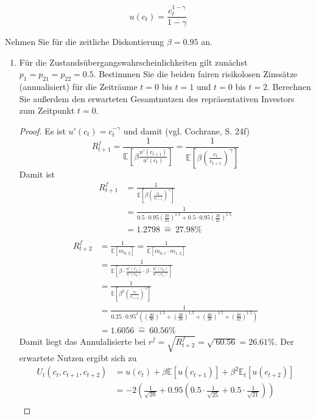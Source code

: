 \documentclass[12pt]{extreport} %
\theoremstyle{named}
\theoremstyle{nnamed}
\theoremstyle{itshape}
\theoremstyle{normal}
\begin{document}
$$ u(c_t) = \frac{c_t^{1-\gamma}}{1 - \gamma} $$

Nehmen Sie für die zeitliche Diskontierung $\beta = 0.95$ an.
\begin{enumerate}
	\item Für die Zustandsübergangswahrscheinlichkeiten gilt zunächst $p_1 = p_{21} = p_{22} = 0.5$. Bestimmen Sie die beiden fairen risikolosen Zinssätze (annualisiert) für die Zeiträume $t = 0$ bis $t = 1$ und $t = 0$ bis $t = 2$. Berechnen Sie außerdem den erwarteten Gesamtnutzen des repräsentativen Investors zum Zeitpunkt $t = 0$.
		\begin{proof}
		Es ist $u'(c_t) = c_t^{-\gamma}$ und damit (vgl. Cochrane, S. 24f)
		$$ R_{t+1}^f = \frac{1}{\mathbb{E}\left[ \beta \frac{u'(c_{t+1})}{u'(c_t)} \right]} = \frac{1}{\mathbb{E}\left[ \beta \left( \frac{c_{t}}{c_{t+1}} \right)^\gamma \right]} $$
		Damit ist
			\begin{align*}
				R_{t+1}^f & = \frac{1}{\mathbb{E}\left[ \beta \left( \frac{c_{t}}{c_{t+1}} \right)^\gamma \right]} \\
				& =\frac{1}{0.5 \cdot 0.95  \left( \frac{20}{25} \right)^{1.5} + 0.5 \cdot 0.95  \left( \frac{20}{21} \right)^{1.5} } \\
				& = 1.2798 ~ \hat{=} ~ 27.98\% \\
			\end{align*}
			\begin{align*}
				R_{t+2}^f & = \frac{1}{\mathbb{E}[m_{0,2}]} = \frac{1}{\mathbb{E}[m_{0,1} \cdot m_{1,2}]}  \\
				& = \frac{1}{\mathbb{E}\left[\beta \cdot \frac{u'(c_1)}{u'(c_0)} \cdot \beta \cdot \frac{u'(c_2)}{u'(c_1)} \right]} \\
				& = \frac{1}{\mathbb{E}\left[ \beta^2 \left( \frac{c_{t}}{c_{t+2}} \right)^\gamma \right]} \\
			& =\frac{1}{0.25 \cdot 0.95^2 \left( \left( \frac{20}{30} \right)^{1.5} +  \left( \frac{20}{26} \right)^{1.5} + \left( \frac{20}{26} \right)^{1.5} + \left( \frac{20}{22} \right)^{1.5} \right)} \\
			& = 1.6056~ \hat{=} ~60.56\%
			\end{align*}
			Damit liegt das Annulalisierte bei $r^f = \sqrt{R_{t+2}^f} = \sqrt{~60.56} = 26.61\%$. Der erwartete Nutzen ergibt sich zu
			\begin{align*}
				U_t(c_t, c_{t+1}, c_{t+2}) & = u(c_t) + \beta \mathbb{E}[ u(c_{t+1})] + \beta^2 \mathbb{E}_t \left[ u(c_{t+2}) \right] \\
						& = -2 \left( \frac{1}{\sqrt{20}} + 0.95 \left( 0.5 \cdot \frac{1}{\sqrt{25}} + 0.5 \cdot \frac{1}{\sqrt{21}} \right)\right) \\

\end{align*}
\end{proof}
\end{enumerate}
\end{document}
